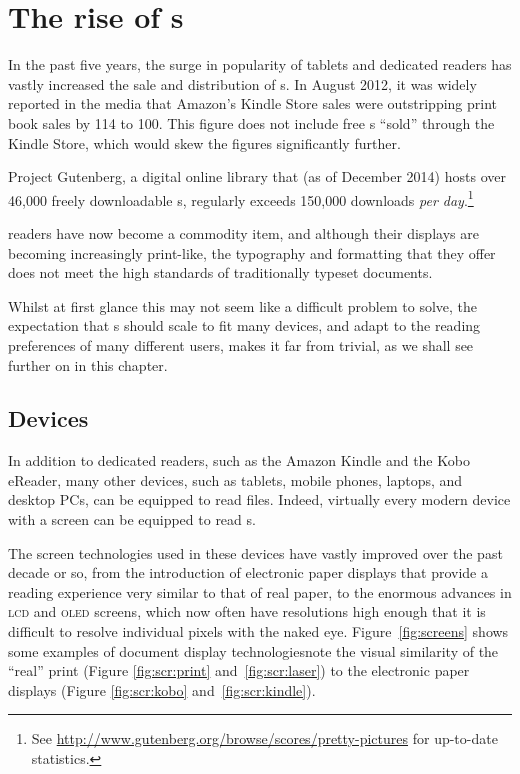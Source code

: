 \cleardoublepage
\chapter{The rise of \ebook{}s} \label{ch:intro}

In the past five years, the surge in popularity of tablets and dedicated \ebook{} readers has vastly increased the sale and distribution of \ebook{}s. In August 2012, it was widely reported in the media that Amazon's Kindle Store sales were outstripping print book sales by 114 to 100.\cite{hexus.net2012} This figure does not include free \ebook{}s ``sold'' through the Kindle Store, which would skew the figures significantly further.

Project Gutenberg, a digital online library that (as of December 2014) hosts over 46,000 freely downloadable \ebook{}s, regularly exceeds 150,000 downloads \emph{per day}.\footnote{See \url{http://www.gutenberg.org/browse/scores/pretty-pictures} for up-to-date statistics.}

\Ebook{} readers have now become a commodity item, and although their displays are becoming increasingly print-like, the typography and formatting that they offer does not meet the high standards of traditionally typeset documents.

Whilst at first glance this may not seem like a difficult problem to solve, the expectation that \ebook{}s should scale to fit many devices, and adapt to the reading preferences of many different users, makes it far from trivial, as we shall see further on in this chapter.

\section{Devices}

In addition to dedicated \ebook{} readers, such as the Amazon Kindle and the Kobo eReader, many other devices, such as tablets, mobile phones, laptops, and desktop PCs, can be equipped to read \ebook{} files. Indeed, virtually every modern device with a screen can be equipped to read \ebook{}s.

The screen technologies used in these devices have vastly improved over the past decade or so, from the introduction of electronic paper displays that provide a reading experience very similar to that of real paper, to the enormous advances in \textsc{lcd} and \textsc{oled} screens, which now often have resolutions high enough that it is difficult to resolve individual pixels with the naked eye. Figure~\ref{fig:screens} shows some examples of document display technologies\ed note the visual similarity of the ``real'' print (Figure \ref{fig:scr:print} and~\ref{fig:scr:laser}) to the electronic paper displays (Figure \ref{fig:scr:kobo} and~\ref{fig:scr:kindle}).

